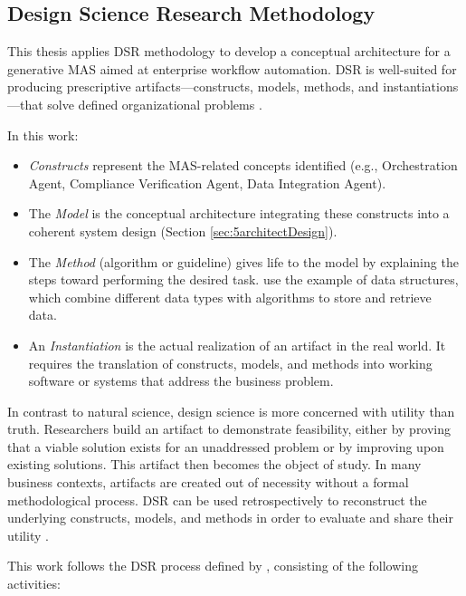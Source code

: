 \subsection{Design Science Research Methodology} \label{subsec:dsrm}
This thesis applies DSR methodology to develop a conceptual architecture for a generative MAS aimed at enterprise workflow automation. DSR is well-suited for producing prescriptive artifacts—constructs, models, methods, and instantiations—that solve defined organizational problems \parencite{hevnerDesignScienceInformation2004}.

In this work:

\begin{itemize}
    \item \emph{Constructs} represent the MAS-related concepts identified (e.g., Orchestration Agent, Compliance Verification Agent, Data Integration Agent).
    \item The \emph{Model} is the conceptual architecture integrating these constructs into a coherent system design (Section \ref{sec:5architectDesign}).
    \item The \emph{Method} (algorithm or guideline) gives life to the model by explaining the steps toward performing the desired task. \textcite{marchDesignNaturalScience1995} use the example of data structures, which combine different data types with algorithms to store and retrieve data.
    \item An \emph{Instantiation} is the actual realization of an artifact in the real world. It requires the translation of constructs, models, and methods into working software or systems that address the business problem.
\end{itemize}

In contrast to natural science, design science is more concerned with utility than truth. Researchers build an artifact to demonstrate feasibility, either by proving that a viable solution exists for an unaddressed problem or by improving upon existing solutions. This artifact then becomes the object of study. In many business contexts, artifacts are created out of necessity without a formal methodological process. DSR can be used retrospectively to reconstruct the underlying constructs, models, and methods in order to evaluate and share their utility \parencite[cf.][pp. 256–259]{marchDesignNaturalScience1995}.

This work follows the DSR process defined by \textcite{peffersDesignScienceMethodology2007}, consisting of the following activities:

